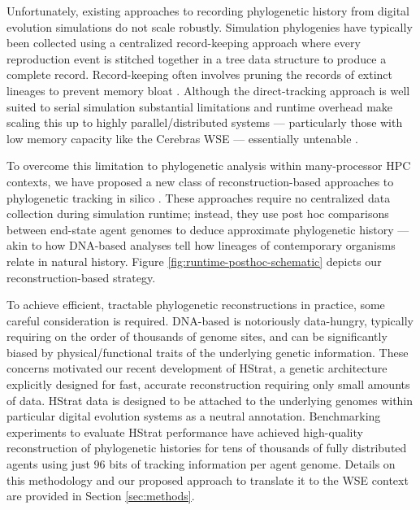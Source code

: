 Unfortunately, existing approaches to recording phylogenetic history from digital evolution simulations do not scale robustly.
Simulation phylogenies have typically been collected using a centralized record-keeping approach where every reproduction event is stitched together in a tree data structure to produce a complete record.
Record-keeping often involves pruning the records of extinct lineages to prevent memory bloat \citep{dolson2023phylotrack}.
Although the direct-tracking approach is well suited to serial simulation substantial limitations and runtime overhead make scaling this up to highly parallel/distributed systems --- particularly those with low memory capacity like the Cerebras WSE --- essentially untenable \citep{moreno2024analysis}.

To overcome this limitation to phylogenetic analysis within many-processor HPC contexts, we have proposed a new class of reconstruction-based approaches to phylogenetic tracking in silico \citep{moreno2022hereditary}.
These approaches require no centralized data collection during simulation runtime; instead, they use post hoc comparisons between end-state agent genomes to deduce approximate phylogenetic history --- akin to how DNA-based analyses tell how lineages of contemporary organisms relate in natural history.
Figure \ref{fig:runtime-posthoc-schematic} depicts our reconstruction-based strategy.

To achieve efficient, tractable phylogenetic reconstructions in practice, some careful consideration is required.
DNA-based is notoriously data-hungry, typically requiring on the order of thousands of genome sites, and can be significantly biased by physical/functional traits of the underlying genetic information.
These concerns motivated our recent development of HStrat, a genetic architecture explicitly designed for fast, accurate reconstruction requiring only small amounts of data.
HStrat data is designed to be attached to the underlying genomes within particular digital evolution systems as a neutral annotation.
Benchmarking experiments to evaluate HStrat performance have achieved high-quality reconstruction of phylogenetic histories for tens of thousands of fully distributed agents using just 96 bits of tracking information per agent genome.
Details on this methodology and our proposed approach to translate it to the WSE context are provided in Section \ref{sec:methods}.


